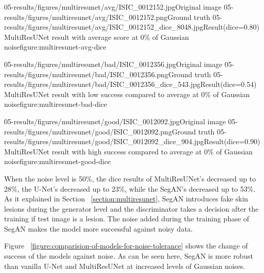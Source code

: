     \sidebyside
        {05-results/figures/multiresunet/avg/ISIC_0012152.jpg}{Original image}
        {05-results/figures/multiresunet/avg/ISIC_0012152.png}{Ground truth}
        {05-results/figures/multiresunet/avg/ISIC_0012152_dice_8048.jpg}{Result(dice=0.80)}
        {MultiResUNet result with average score at 0\% of Gaussian noise}{figure:multiresunet-avg-dice}

    \sidebyside
        {05-results/figures/multiresunet/bad/ISIC_0012356.jpg}{Original image}
        {05-results/figures/multiresunet/bad/ISIC_0012356.png}{Ground truth}
        {05-results/figures/multiresunet/bad/ISIC_0012356_dice_543.jpg}{Result(dice=0.54)}
        {MultiResUNet result with low success compared to average at 0\% of Gaussian noise}{figure:multiresunet-bad-dice}

    \sidebyside
        {05-results/figures/multiresunet/good/ISIC_0012092.jpg}{Original image}
        {05-results/figures/multiresunet/good/ISIC_0012092.png}{Ground truth}
        {05-results/figures/multiresunet/good/ISIC_0012092_dice_904.jpg}{Result(dice=0.90)}
        {MultiResUNet result with high success compared to average at 0\% of Gaussian noise}{figure:multiresunet-good-dice}

    When the noise level is 50\%, the dice results of MultiResUNet's decreased up to 28\%, the U-Net's decreased up to 23\%, while the SegAN's decreased up to 53\%.
    As it explained in Section ~\ref{section:multiresunet}, SegAN introduces fake skin lesions during the generator level and the discriminator
    takes a decision after the training if test image is a lesion.
    The noise added during the training phase of SegAN makes the model more successful against noisy data.

    Figure ~\ref{figure:comparision-of-models-for-noise-tolerance} shows the change of success of the models against noise.
    As can be seen here, SegAN is more robust than vanilla U-Net and MultiResUNet at increased levels of Gaussian noises.

    

    

    

    

    

    


